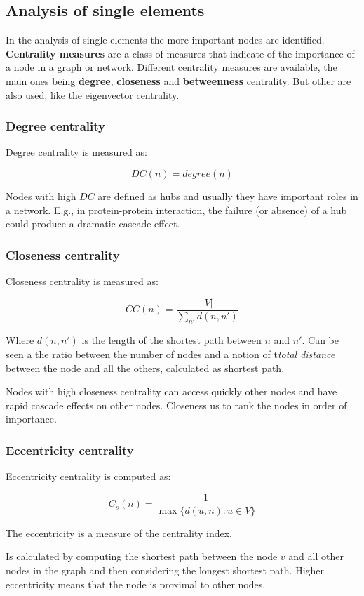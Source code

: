 	\subsection{Analysis of single elements}
	In the analysis of single elements the more important nodes are identified.
	\textbf{Centrality measures} are a class of measures that indicate of the importance of a node in a graph or network.
	Different centrality measures are available, the main ones being \textbf{degree}, \textbf{closeness} and \textbf{betweenness} centrality.
	But other are also used, like the eigenvector centrality.

		\subsubsection{Degree centrality}
		Degree centrality is measured as:

		$$DC(n) = degree(n)$$

		Nodes with high $DC$ are defined as hubs and usually they have important roles in a network.
E.g., in protein-protein interaction, the failure (or absence) of a hub could produce a dramatic cascade effect.

		\subsubsection{Closeness centrality}
		Closeness centrality is measured as:

		$$CC(n) = \frac{|V|}{\sum\limits_{n'}d(n,n')}$$

		Where $d(n,n')$ is the length of the shortest path between $n$ and $n'$.
		Can be seen a the ratio between the number of nodes and a notion of t\textit{total distance} between the node and all the others, calculated as shortest path.

		Nodes with high closeness centrality can access quickly other nodes and have rapid cascade effects on other nodes.
		Closeness us to rank the nodes in order of importance.

		\subsubsection{Eccentricity centrality}
		Eccentricity centrality is computed as:

		$$C_s(n) = \frac{1}{\max\{d(u,n):u\in V\}}$$

		The eccentricity is a measure of the centrality index.

		Is calculated by computing the shortest path between the node $v$ and all other nodes in the graph and then considering the longest shortest path.
		Higher eccentricity means that the node is proximal to other nodes.

